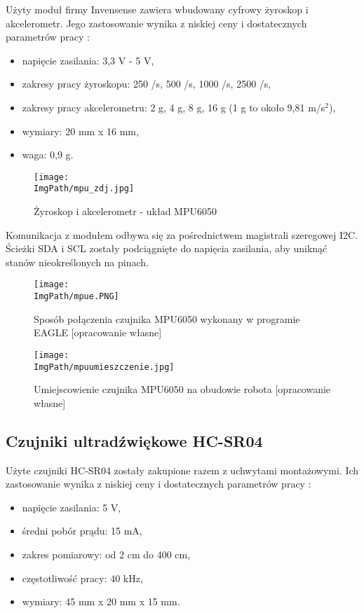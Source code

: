\documentclass[a4paper,12pt,twoside,openany]{report}
\newcommand{\ImgPath}{.}
\begin{document}
Użyty moduł firmy Invensense zawiera wbudowany cyfrowy żyroskop i akcelerometr. Jego zastosowanie wynika z niskiej ceny i dostatecznych parametrów pracy \cite{mpu}:
\begin{itemize}
\item napięcie zasilania: 3,3 V - 5 V,
\item zakresy pracy żyroskopu: 250 \textdegree/s, 500 \textdegree/s, 1000 \textdegree/s, 2500 \textdegree/s,
\item zakresy pracy akcelerometru: 2 g, 4 g, 8 g, 16 g (1 g to około 9,81 m/s$^2$),
\item wymiary: 20 mm x 16 mm,
\item waga: 0,9 g.
\end{itemize}

\begin{figure}[!htbp]
	\begin{center}
\centering
\texttt{[image: \\ImgPath/mpu\_zdj.jpg]}
\end{center}
	\caption{Żyroskop i akcelerometr - układ MPU6050 \cite{mpuallegro}}
	\label{schematKomunikacji}
\end{figure}

Komunikacja z modułem odbywa się za pośrednictwem magistrali szeregowej I2C. Ścieżki SDA i SCL zostały podciągnięte do napięcia zasilania, aby uniknąć stanów nieokreślonych na pinach. 

\begin{figure}[!htbp]
	\begin{center}
\centering
\texttt{[image: \\ImgPath/mpue.PNG]}
\end{center}
	\caption{Sposób połączenia czujnika MPU6050 wykonany w programie EAGLE [opracowanie własne]}
	\label{schematKomunikacji}
\end{figure}

\begin{figure}[!htbp]
	\begin{center}
\centering
\texttt{[image: \\ImgPath/mpuumieszczenie.jpg]}
\end{center}
	\caption{Umiejscowienie czujnika MPU6050 na obudowie robota [opracowanie własne]}
	\label{schematKomunikacji}
\end{figure}

\subsection{Czujniki ultradźwiękowe HC-SR04}

Użyte czujniki HC-SR04 zostały zakupione razem z uchwytami montażowymi. Ich zastosowanie wynika z niskiej ceny i dostatecznych parametrów pracy \cite{hcsr04}:
\begin{itemize}
\item napięcie zasilania: 5 V,
\item średni pobór prądu: 15 mA,
\item zakres pomiarowy: od 2 cm do 400 cm,
\item częstotliwość pracy: 40 kHz,
\item wymiary: 45 mm x 20 mm x 15 mm.
\end{itemize}
\end{document}
